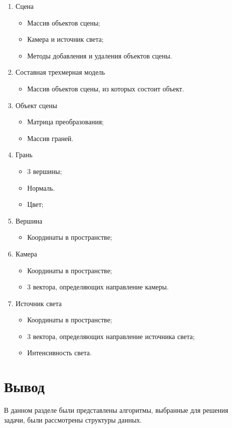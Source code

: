 \begin{enumerate}
    \item Сцена
        \begin{itemize}
            \item Массив объектов сцены;
            \item Камера и источник света;
            \item Методы добавления и удаления объектов сцены.
        \end{itemize}
    \item Составная трехмерная модель
        \begin{itemize}
            \item Массив объектов сцены, из которых состоит объект.
        \end{itemize}
    \item Объект сцены
        \begin{itemize}
            \item Матрица преобразования;
            \item Массив граней.
        \end{itemize}
    \item Грань
        \begin{itemize}
            \item 3 вершины;
            \item Нормаль.
            \item Цвет;
        \end{itemize}
    \item Вершина
        \begin{itemize}
            \item Координаты в пространстве;
        \end{itemize}
    \item Камера
        \begin{itemize}
            \item Координаты в пространстве;
            \item 3 вектора, определяющих направление камеры.
        \end{itemize}
    \item Источник света
        \begin{itemize}
            \item Координаты в пространстве;
            \item 3 вектора, определяющих направление источника света;
            \item Интенсивность света.
        \end{itemize}
\end{enumerate}


\section{Вывод}

В данном разделе были представлены алгоритмы, выбранные для решения задачи,
были рассмотрены структуры данных.
